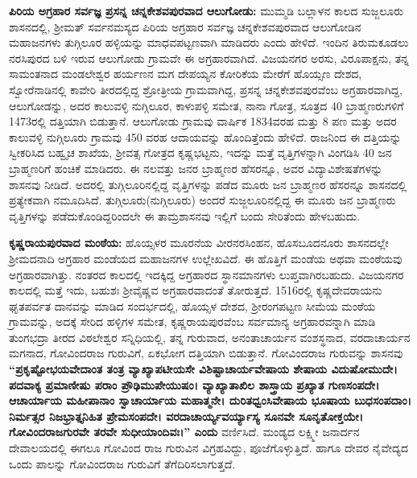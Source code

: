 \textbf{ಪಿರಿಯ ಅಗ್ರಹಾರ ಸರ್ವಜ್ಞ ಪ್ರಸನ್ನ ಚನ್ನಕೇಶವಪುರವಾದ ಆಲುಗೋಡು:} ಮುಮ್ಮಡಿ ಬಲ್ಲಾಳನ ಕಾಲದ ಸುಜ್ಜಲೂರು ಶಾಸನದಲ್ಲಿ, ಶ‍್ರೀಮತ್​ ಸರ್ವನಮಸ್ಯದ ಪಿರಿಯ ಅಗ್ರಹಾರ ಸರ್ವಜ್ಞ ಚನ್ನಕೇಶವಪುರವಾದ ಆಲುಗೋಡಿನ ಮಹಾಜನಗಳು ತುಗ್ಗಿಲೂರ ಹಳ್ಳಿಯನ್ನು ಮಾಧವಪಟ್ಟಣವಾಗಿ ಮಾಡಿದರು ಎಂದು ಹೇಳಿದೆ. ಇಂದಿನ ತಿರುಮಕೂಡಲು ನರಸಿಪುರದ ಬಳಿ ಇರುವ ಆಲುಗೋಡು ಗ್ರಾಮವೇ ಈ ಅಗ್ರಹಾರವಾಗಿದೆ. ವಿಜಯನಗರ ಅರಸು, ವಿರೂಪಾಕ್ಷನು, ತನ್ನ ಸಾಮಂತನಾದ ಮಂಡಲೇಶ್ವರ ಹರ್ಯಣನ ಮಗ ದೇಪಯ್ಯನ ಕೋರಿಕೆಯ ಮೇರೆಗೆ ಹೊಯ್ಸಣ ದೇಶದ, ಸ್ವೋರೆನಾಡಿನಲ್ಲಿ ಕಾವೇರಿ ತೀರದಲ್ಲಿದ್ದ ಶ್ರೋತ್ರೀಯ ಗ್ರಾಮವಾಗಿದ್ದ, ಪ್ರಸನ್ನ ಚನ್ನಕೇಶವಪುರವೆಂಬ ಅಗ್ರಹಾರವಾಗಿದ್ದ, ಆಲುಗೋಡನ್ನು, ಅದರ ಕಾಲುವಳ್ಳಿ ನುಗ್ಗಿಲೂರ, ಕಾಳುಪಳ್ಳಿ ಸಮೇತ, ನಾನಾ ಗೋತ್ರ, ಸೂತ್ರದ 40 ಬ್ರಾಹ್ಮಣರುಗಳಿಗೆ 1473ರಲ್ಲಿ ದತ್ತಿಯಾಗಿ ಬಿಡುತ್ತಾನೆ. ಆಲುಗೋಡು ಗ್ರಾಮವು ವಾರ್ಷಿಕ 1834ವರಹ ಮತ್ತು 8 ಪಣ ಮತ್ತು ಅದರ ಕಾಲುವಳ್ಳಿ ನುಗ್ಗಿಲೂರು ಗ್ರಾಮವು 450 ವರಹ ಆದಾಯವನ್ನು ಹೊಂದಿತ್ತೆಂದು ಹೇಳಿದೆ. ರಾಜನಿಂದ ಈ ದತ್ತಿಯನ್ನು ಸ್ವೀಕರಿಸಿದ ಬಹ್ವೃಚ ಶಾಖೆಯ, ಶ‍್ರೀವತ್ಸ ಗೋತ್ರದ ಕೃಷ್ಣಭಟ್ಟನು, ಇದನ್ನು ಮತ್ತೆ ವೃತ್ತಿಗಳನ್ನಾಗಿ ವಿಂಗಡಿಸಿ 40 ಜನ ಬ್ರಾಹ್ಮಣರಿಗೆ ಹಂಚಿಕೆ ಮಾಡಿದರು. ಈ ನಲವತ್ತು ಜನರ ಬ್ರಾಹ್ಮಣರ ಹೆಸರನ್ನೂ, ಅವರ ವಿದ್ಯಾವಿಶೇಷತೆಗಳನ್ನು ಶಾಸನವು ನೀಡಿದೆ. ಅದರಲ್ಲಿ ತುಗ್ಗಿಲೂರಿನಲ್ಲಿದ್ದ ವೃತ್ತಿಗಳನ್ನು ಪಡೆದ ಮೂರು ಜನ ಬ್ರಾಹ್ಮಣರ ಹೆಸರನ್ನೂ ಶಾಸನದಲ್ಲಿ ಪ್ರತ್ಯೇಕವಾಗಿ ನಮೂದಿಸಿದೆ. ತುಗ್ಗಿಲೂರು(ನುಗ್ಗಿಲೂರು) ಅಂದರೆ ಸುಜ್ಜಲೂರಿನಲ್ಲಿದ್ದ ಈ ಮೂರು ಜನ ಬ್ರಾಹ್ಮಣರು ವೃತ್ತಿಗಳನ್ನು ಪಡೆದುಕೊಂಡಿದ್ದರಿಂದಲೇ ಈ ತಾಮ್ರಶಾಸನವು ಇಲ್ಲಿಗೆ ಬಂದು ಸೇರಿತೆಂದು ಹೇಳಬಹುದು.

\textbf{ಕೃಷ್ಣರಾಯಪುರವಾದ ಮಂಠೆಯ:} ಹೊಯ್ಸಳರ ಮೂರನೆಯ ವೀರನರಸಿಂಹನ, ಹೊಸಬೂದನೂರು ಶಾಸನದಲ್ಲೇ ಶ‍್ರೀಮದನಾದಿ ಅಗ್ರಹಾರ ಮಂಡೆಯದ ಮಹಾಜನಗಳ ಉಲ್ಲೇಖವಿದೆ. ಈ ಹೊತ್ತಿಗೆ ಮಂಡೆಯ ಅಥವಾ ಮಂಠೆಯವು ಅಗ್ರಹಾರವಾಗಿತ್ತು. ನಂತರದ ಕಾಲದಲ್ಲಿ ಇದಕ್ಕಿದ್ದ ಅಗ್ರಹಾರದ ಸ್ಥಾನಮಾನಗಳು ಲುಪ್ತವಾಗಿರಬಹುದು. ವಿಜಯನಗರ ಕಾಲದಲ್ಲಿ ಮತ್ತೆ ಇದು, ಬಹುಶಃ ಶ‍್ರೀವೈಷ್ಣವ ಅಗ್ರಹಾರವಾದಂತೆ ತೋರುತ್ತದೆ. 1516ರಲ್ಲಿ ಕೃಷ್ಣದೇವರಾಯನು ಘೃತಪರ್ವತ ದಾನವನ್ನು ಮಾಡಿದ ಸಂದರ್ಭದಲ್ಲಿ, ಹೊಯ್ಸಳ ದೇಶದ, ಶ‍್ರೀರಂಗಪಟ್ಟಣ ಸೀಮೆಯ ಮಂಠೆಯ ಗ್ರಾಮವನ್ನು, ಅದಕ್ಕೆ ಸೇರಿದ ಹಳ್ಳಿಗಳ ಸಮೇತ, ಕೃಷ್ಣರಾಯಪುರವೆಂಬ ಸರ್ವಮಾನ್ಯ ಅಗ್ರಹಾರವನ್ನಾಗಿ ಮಾಡಿ ತುಂಗಭದ್ರಾ ತೀರದ ವಿಠಲೇಶ್ವರ ಸನ್ನಿಧಿಯಲ್ಲಿ, ತನ್ನ ಗುರುವಾದ, ಅನಂತಾಚಾರ್ಯನ ವಂಶಸ್ಥನಾದ, ವರದಾಚಾರ್ಯನ ಮಗನಾದ, ಗೋವಿಂದರಾಜ ಗುರುವಿಗೆ, ಏಕಭೋಗ ದತ್ತಿಯಾಗಿ ಬಿಡುತ್ತಾನೆ. ಗೋವಿಂದರಾಜ ಗುರುವನ್ನು ಶಾಸನವು \textbf{“ಪ್ರಕೃಷ್ಟೋಭಯವೇದಾಂತ ತಂತ್ರ ವ್ಯಾಖ್ಯಾಪಟೀಯಸೇ ವಿಶಿಷ್ಟಾಚಾರ್ಯವೇಷಾಯ ಶೇಷಾಯ ವಿದುಷೋಮುದೇ। ಪದವಾಕ್ಯ ಪ್ರಮಾಣೀಷು ಪರಾಂ ಪ್ರೌಢಿಮುಪೇಯುಷಂ। ವ್ಯಾಖ್ಯಾತಾಖಿಲ ಶಾಸ್ತ್ರಾಯ ಪ್ರಖ್ಯಾತ ಗುಣಸಂಪದೇ। ಆಚಾರ್ಯಾಯ ಮಹೀಪಾನಾಂ\general{\break } ಸ್ವಾಚಾರ್ಯಾಯ ಮಹಾತ್ಮನೇ। ದುರಿತಧ್ವಂಸಿವೇಷಾಯ ಭೂಷಾಯ ಬುಧಸಂಪದಾಂ। ನಿರ್ಮತ್ಸರ ನಿಜಭ್ರಾತ್ತೃನಿಹಿತ\general{\break } ಪ್ರೇಮಸಂಪದೇ। ವರದಾಚಾರ್ಯ್ಯವರ್ಯ್ಯಾಸ್ಯ ಸೂನವೇ ಸೂನೃತೋಕ್ತಯೇ। ಗೋವಿಂದರಾಜಗುರವೇ ತರವೇ\general{\break } ಸುಧೀಯಾಂದಿವಃ।” ಎಂದು} ವರ್ಣಿಸಿದೆ. ಮಂಡ್ಯದ ಲಕ್ಷ್ಮೀ ಜನಾರ್ದನ ದೇವಾಲಯದಲ್ಲಿ ಈಗಲೂ ಗೋವಿಂದ ರಾಜ ಗುರುವಿನ ವಿಗ್ರಹವಿದ್ದು, ಪೂಜೆಗೊಳ್ಳುತ್ತಿದೆ. ಹಾಗೂ ದೇವರ ನೈವೇದ್ಯದ ಒಂದು ಪಾಲನ್ನು ಗೋವಿಂದರಾಜ ಗುರುವಿಗೆ ತೆಗೆದಿರಿಸಲಾಗುತ್ತದೆ.

